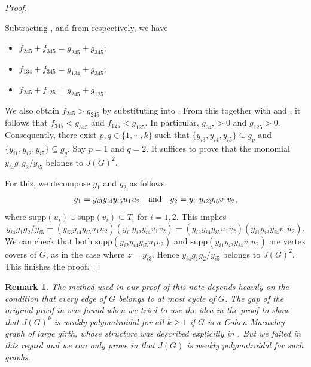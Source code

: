 \documentclass[sn-mathphys,Numbered]{sn-jnl}%
\theoremstyle{thmstyleone}%
\theoremstyle{thmstyletwo}%
\newtheorem{remark}{Remark}%
\theoremstyle{thmstylethree}%
\begin{document}
\begin{proof}
\begin{itemize}
  \end{itemize}


  Subtracting ,  and   from   respectively, we have
  \begin{itemize}
   \item   $f_{245}+f_{345}=g_{245}+g_{345}$; \hfill {}
    \item    $f_{134}+f_{345}=g_{134}+g_{345}$; \hfill {}
     \item    $f_{245}+f_{125}=g_{245}+g_{125}$. \hfill {}
        \end{itemize}

  We also obtain $f_{245}>g_{245}$ by substituting   into .
  From this together with  and , it follows that $f_{345}<g_{345}$ and $f_{125}<g_{125}.$ In particular, $g_{345}>0$ and $g_{125}>0$. Consequently, there exist $p,q\in \{1,\cdots, k\}$ such that $\{y_{i3},y_{i4},y_{i5}\}\subseteq g_p$ and $\{y_{i1},y_{i2},y_{i5}\}\subseteq g_q$.  Say $p=1$ and $q=2$. It suffices to prove that the monomial $y_{i4}g_1g_2/y_{i5}$ belongs to $J(G)^2$.

For this, we  decompose $g_1$ and $g_2$ as follows: $$g_1=y_{i3}y_{i4}y_{i5}u_1u_2 \mbox{\quad and\quad }g_2=y_{i1}y_{i2}y_{i5}v_1v_2 ,$$ where $\mathrm{supp}(u_i)\cup\mathrm{supp}(v_i)\subseteq T_i$  for $i=1,2$.  This implies $$y_{i4}g_1g_2/y_{i5}=(y_{i3}y_{i4}y_{i5}u_1u_2)(y_{i1}y_{i2}y_{i4}v_1v_2)=(y_{i2}y_{i4}y_{i5}u_1v_2)(y_{i1}y_{i3}y_{i4}v_1u_2).$$
   We can check  that both $\mathrm{supp}(y_{i2}y_{i4}y_{i5}u_1v_2)$ and $\mathrm{supp}(y_{i1}y_{i3}y_{i4}v_1u_2)$ are vertex covers of $G$, as in the case where $z=y_{i3}$. Hence $y_{i4}g_1g_2/y_{i5}$ belongs to $J(G)^2$. This finishes the proof. \end{proof}


\vspace{2mm}

\begin{remark} \em The method used in our proof of this note depends heavily on the condition that every edge of $G$  belongs to at most cycle of $G$. The gap of the original proof in \cite{M} was found when we tried to use the idea in the proof to show that $J(G)^k$ is weakly polymatroidal for all $k\geq 1$ if $G$ is a Cohen-Macaulay graph of large girth, whose structure was described explicitly in \cite{HMT}.  But we failed in this regard and we can only  prove in \cite[Proposition 3.6]{LW} that $J(G)$ is weakly polymatroidal for such graphs.
\end{remark}
\end{document}
